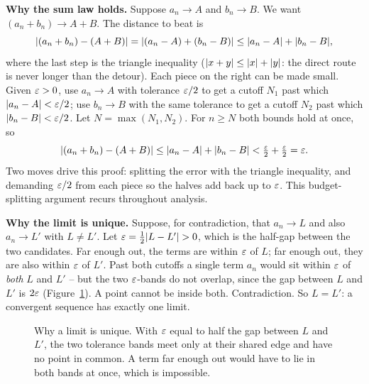 \begin{whybox}
\textbf{Why the sum law holds.} Suppose $a_n \to A$ and $b_n \to B$. We want
$(a_n + b_n) \to A + B$. The distance to beat is
\[
  \lvert(a_n + b_n) - (A + B)\rvert = \lvert(a_n - A) + (b_n - B)\rvert
    \le \lvert a_n - A\rvert + \lvert b_n - B\rvert,
\]
where the last step is the triangle inequality ($\lvert x + y\rvert \le \lvert x\rvert + \lvert y\rvert$: the direct route is never longer than the detour). Each piece on the right can be
made small. Given $\varepsilon > 0$, use $a_n \to A$ with tolerance $\varepsilon/2$ to get a
cutoff $N_1$ past which $\lvert a_n - A\rvert < \varepsilon/2$; use $b_n \to B$ with the same
tolerance to get a cutoff $N_2$ past which $\lvert b_n - B\rvert < \varepsilon/2$. Let $N =
\max(N_1, N_2)$. For $n \ge N$ both bounds hold at once, so
\[
  \lvert(a_n + b_n) - (A+B)\rvert \le \lvert a_n - A\rvert + \lvert b_n - B\rvert
    < \tfrac{\varepsilon}2 + \tfrac{\varepsilon}2 = \varepsilon .
\]
Two moves drive this proof: splitting the error with the triangle inequality,
and demanding $\varepsilon/2$ from each piece so the halves add back up to $\varepsilon$. This
budget-splitting argument recurs throughout analysis.
\end{whybox}

\begin{whybox}
\textbf{Why the limit is unique.} Suppose, for contradiction, that $a_n \to L$
and also $a_n \to L'$ with $L \ne L'$. Let $\varepsilon = \tfrac12\lvert L - L'\rvert > 0$,
which is the half-gap between the two candidates. Far enough out, the terms are
within $\varepsilon$ of $L$; far enough out, they are also within $\varepsilon$ of $L'$. Past
both cutoffs a single term $a_n$ would sit within $\varepsilon$ of \emph{both} $L$ and
$L'$ -- but the two $\varepsilon$-bands do not overlap, since the gap between $L$ and
$L'$ is $2\varepsilon$ (Figure~\ref{ch28:fig-unique}). A point cannot be inside both. Contradiction. So $L = L'$: a
convergent sequence has exactly one limit.
\end{whybox}

\begin{figure}[htbp]
\centering
{}
\caption{Why a limit is unique. With $\varepsilon$ equal to half the gap between $L$
and $L'$, the two tolerance bands meet only at their shared edge and have no
point in common. A term far enough out would have to lie in both bands at once,
which is impossible.}
\label{ch28:fig-unique}
\end{figure}

